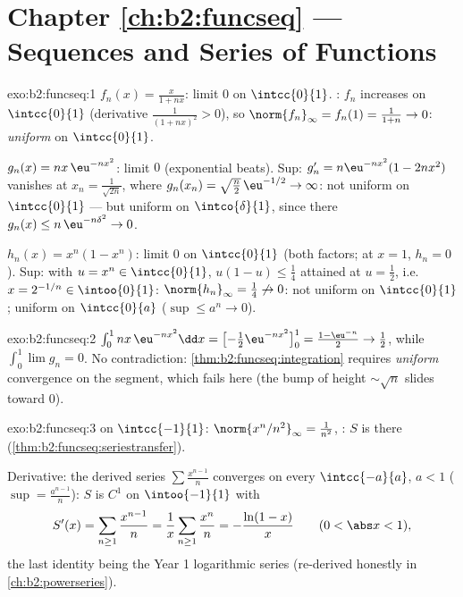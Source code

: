 \section*{Chapter \ref{ch:b2:funcseq} --- Sequences and Series of
Functions}

\begin{solution}{exo:b2:funcseq:1}
$f_n(x) = \frac{x}{1 + nx}$:  limit $0$ on $\intcc{0}{1}$.
: $f_n$ increases on $\intcc{0}{1}$ (derivative
$\frac{1}{(1+nx)^2} > 0$), so $\norm{f_n}_\infty = f_n(1) =
\frac{1}{1+n} \to 0$: \emph{uniform} on $\intcc{0}{1}$.

$g_n(x) = nx\,\eu^{-nx^2}$:  limit $0$ (exponential
beats). Sup: $g_n' = n\eu^{-nx^2}(1 - 2nx^2)$ vanishes at $x_n =
\frac{1}{\sqrt{2n}}$, where $g_n(x_n) = \sqrt{\frac n2}\,\eu^{-1/2}
\to \infty$: not uniform on $\intcc{0}{1}$ --- but uniform on
$\intco{\delta}{1}$, since there $g_n(x) \leq n\,\eu^{-n\delta^2}
\to 0$.

$h_n(x) = x^n(1 - x^n)$:  limit $0$ on $\intcc{0}{1}$
(both factors; at $x = 1$, $h_n = 0$). Sup: with $u = x^n \in
\intcc{0}{1}$, $u(1-u) \leq \frac14$ attained at $u = \frac12$,
i.e.\ $x = 2^{-1/n} \in \intoo{0}{1}$: $\norm{h_n}_\infty =
\frac14 \not\to 0$: not uniform on $\intcc{0}{1}$; uniform on
$\intcc{0}{a}$ ($\sup \leq a^n \to 0$).
\end{solution}

\begin{solution}{exo:b2:funcseq:2}
$\int_0^1 nx\,\eu^{-nx^2}\dd x = \bigl[-\tfrac12
\eu^{-nx^2}\bigr]_0^1 = \frac{1 - \eu^{-n}}{2} \to \frac12$, while
$\int_0^1 \lim g_n = 0$. No contradiction:
\cref{thm:b2:funcseq:integration} requires \emph{uniform}
convergence on the segment, which fails here (the bump of height
$\sim\sqrt n$ slides toward $0$).
\end{solution}

\begin{solution}{exo:b2:funcseq:3}
 on $\intcc{-1}{1}$: $\norm{x^n/n^2}_\infty =
\frac{1}{n^2}$, : $S$ is  there
(\cref{thm:b2:funcseq:seriestransfer}).

Derivative: the derived series $\sum \frac{x^{n-1}}{n}$ converges
 on every $\intcc{-a}{a}$, $a < 1$ ($\sup =
\frac{a^{n-1}}{n}$): $S$ is $C^1$ on $\intoo{-1}{1}$ with
\[
S'(x) = \sum_{n\geq1} \frac{x^{n-1}}{n} = \frac1x \sum_{n\geq1}
\frac{x^n}{n} = -\frac{\ln(1 - x)}{x}
\qquad (0 < \abs x < 1),
\]
the last identity being the Year 1 logarithmic series (re-derived
honestly in \cref{ch:b2:powerseries}).
\end{solution}

